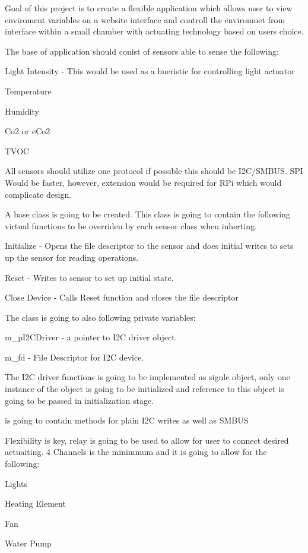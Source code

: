 Goal of this project is to create a flexible application which allows user to view enviroment variables on a website interface and controll the enviromnet from interface within a small chamber with actuating technology based on user\textquotesingle{}s choice.

The base of application should conist of sensors able to sense the following\+:
\begin{DoxyItemize}
\item Light Intensity -\/ This would be used as a hueristic for controlling light actuator
\item Temperature
\item Humidity
\item Co2 or e\+Co2
\item T\+V\+OC
\end{DoxyItemize}

All sensors should utilize one protocol if possible this should be I2\+C/\+S\+M\+B\+US. S\+PI Would be faster, however, extension would be required for R\+Pi which would complicate design.

A base class is going to be created. This class is going to contain the following virtual functions to be overriden by each sensor class when inherting.
\begin{DoxyItemize}
\item Initialize -\/ Opens the file descriptor to the sensor and does initial writes to sets up the sensor for reading operations.
\item Reset -\/ Writes to sensor to set up initial state.
\item Close Device -\/ Calls Reset function and closes the file descriptor
\end{DoxyItemize}

The class is going to also following private variables\+:
\begin{DoxyItemize}
\item m\+\_\+p\+I2\+C\+Driver -\/ a pointer to I2C driver object.
\item m\+\_\+fd -\/ File Descriptor for I2C device.
\end{DoxyItemize}

The I2C driver functions is going to be implemented as signle object, only one instance of the object is going to be initialized and reference to this object is going to be passed in initialization stage.

is going to contain methods for plain I2C writes as well as S\+M\+B\+US

Flexibility is key, relay is going to be used to allow for user to connect desired actuaiting. 4 Channels is the minimmum and it is going to allow for the following\+:
\begin{DoxyItemize}
\item Lights
\item Heating Element
\item Fan
\item Water Pump
\end{DoxyItemize}

